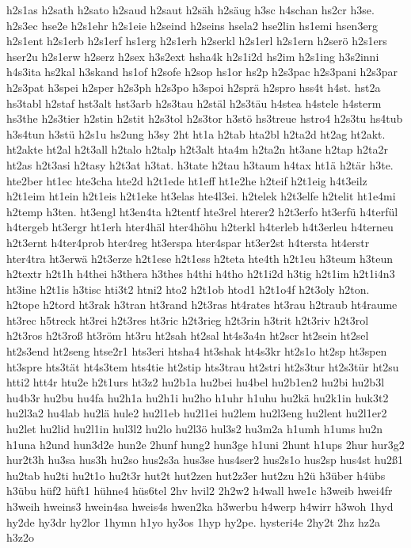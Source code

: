 {h2s1as
h2sath
h2sato
h2saud
h2saut
h2säh
h2säug
h3sc
h4schan
hs2cr
h3se.
h2s3ec
hse2e
h2s1ehr
h2s1eie
h2seind
h2seins
hsela2
hse2lin
hs1emi
hsen3erg
h2s1ent
h2s1erb
h2s1erf
hs1erg
h2s1erh
h2serkl
h2s1erl
h2s1ern
h2serö
h2s1ers
hser2u
h2s1erw
h2serz
h2sex
h3s2ext
hsha4k
h2s1i2d
hs2im
h2s1ing
h3s2inni
h4s3ita
hs2kal
h3skand
hs1of
h2sofe
h2sop
hs1or
hs2p
h2s3pac
h2s3pani
h2s3par
h2s3pat
h3spei
h2sper
h2s3ph
h2s3po
h3spoi
h2sprä
h2spro
hss4t
h4st.
hst2a
hs3tabl
h2staf
hst3alt
hst3arb
h2s3tau
h2stäl
h2s3täu
h4stea
h4stele
h4sterm
hs3the
h2s3tier
h2stin
h2stit
h2s3tol
h2s3tor
h3stö
hs3treue
hstro4
h2s3tu
hs4tub
h3s4tun
h3stü
h2s1u
hs2ung
h3sy
2ht
ht1a
h2tab
hta2bl
h2ta2d
ht2ag
ht2akt.
ht2akte
ht2al
h2t3all
h2talo
h2talp
h2t3alt
hta4m
h2ta2n
ht3ane
h2tap
h2ta2r
ht2as
h2t3asi
h2tasy
h2t3at
h3tat.
h3tate
h2tau
h3taum
h4tax
ht1ä
h2tär
h3te.
hte2ber
ht1ec
hte3cha
hte2d
h2t1ede
ht1eff
ht1e2he
h2teif
h2t1eig
h4t3eilz
h2t1eim
ht1ein
h2t1eis
h2t1eke
ht3elas
hte4l3ei.
h2telek
h2t3elfe
h2telit
ht1e4mi
h2temp
h3ten.
ht3engl
ht3en4ta
h2tentf
hte3rel
hterer2
h2t3erfo
ht3erfü
h4terfül
h4tergeb
ht3ergr
ht1erh
hter4häl
hter4höhu
h2terkl
h4terleb
h4t3erleu
h4terneu
h2t3ernt
h4ter4prob
hter4reg
ht3erspa
hter4spar
ht3er2st
h4tersta
ht4erstr
hter4tra
ht3erwä
h2t3erze
h2t1ese
h2t1ess
h2teta
hte4th
h2t1eu
h3teum
h3teun
h2textr
h2t1h
h4thei
h3thera
h3thes
h4thi
h4tho
h2t1i2d
h3tig
h2t1im
h2t1i4n3
ht3ine
h2t1is
h3tisc
hti3t2
htni2
hto2
h2t1ob
htod1
h2t1o4f
h2t3oly
h2ton.
h2tope
h2tord
ht3rak
h3tran
ht3rand
h2t3ras
ht4rates
ht3rau
h2traub
ht4raume
ht3rec
h5treck
ht3rei
h2t3res
ht3ric
h2t3rieg
h2t3rin
h3trit
h2t3riv
h2t3rol
h2t3ros
h2t3roß
ht3röm
ht3ru
ht2sah
ht2sal
ht4s3a4n
ht2scr
ht2sein
ht2sel
ht2s3end
ht2seng
htse2r1
hts3eri
htsha4
ht3shak
ht4s3kr
ht2s1o
ht2sp
ht3spen
ht3spre
hts3tät
ht4s3tem
hts4tie
ht2stip
hts3trau
ht2stri
ht2s3tur
ht2s3tür
ht2su
htti2
htt4r
htu2e
h2t1urs
ht3z2
hu2b1a
hu2bei
hu4bel
hu2b1en2
hu2bi
hu2b3l
hu4b3r
hu2bu
hu4fa
hu2h1a
hu2h1i
hu2ho
h1uhr
h1uhu
hu2kä
hu2k1in
huk3t2
hu2l3a2
hu4lab
hu2lä
hule2
hu2l1eb
hu2l1ei
hu2lem
hu2l3eng
hu2lent
hu2l1er2
hu2let
hu2lid
hu2l1in
hul3l2
hu2lo
hu2l3ö
hul3s2
hu3m2a
h1umh
h1ums
hu2n
h1una
h2und
hun3d2e
hun2e
2hunf
hung2
hun3ge
h1uni
2hunt
h1ups
2hur
hur3g2
hur2t3h
hu3sa
hus3h
hu2so
hus2s3a
hus3se
hus4ser2
hus2s1o
hus2sp
hus4st
hu2ß1
hu2tab
hu2ti
hu2t1o
hu2t3r
hut2t
hut2zen
hut2z3er
hut2zu
h2ü
h3über
h4übs
h3übu
hüf2
hüft1
hühne4
hüs6tel
2hv
hvil2
2h2w2
h4wall
hwe1c
h3weib
hwei4fr
h3weih
hweins3
hwein4sa
hweis4s
hwen2ka
h3werbu
h4werp
h4wirr
h3woh
1hyd
hy2de
hy3dr
hy2lor
1hymn
h1yo
hy3os
1hyp
hy2pe.
hysteri4e
2hy2t
2hz
hz2a
h3z2o
}
